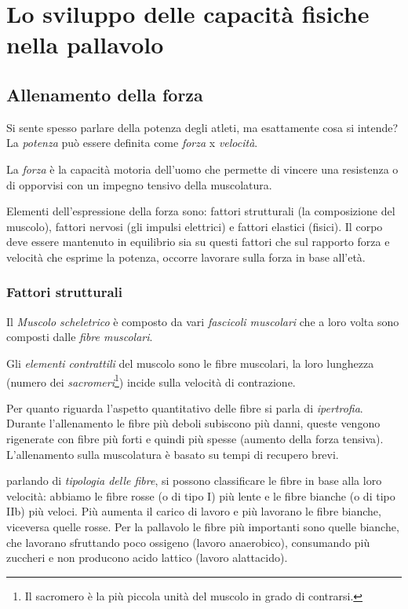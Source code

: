 \chapter{Lo sviluppo delle capacità fisiche nella pallavolo}\label{fisico}

\section{Allenamento della forza}
Si sente spesso parlare della potenza degli atleti, ma esattamente cosa si
intende? La \emph{potenza} può essere definita come \emph{forza} x
\emph{velocità}.

\begin{defi}
La \emph{forza} è la capacità motoria dell'uomo che permette di vincere una resistenza o di opporvisi con un impegno tensivo della muscolatura.
\end{defi}

Elementi dell'espressione della forza sono: fattori strutturali (la composizione
del muscolo), fattori nervosi (gli impulsi elettrici) e fattori elastici (fisici).
Il corpo deve essere mantenuto in equilibrio sia su questi fattori che sul
rapporto forza e velocità che esprime la potenza, occorre lavorare sulla forza
in base all'età.

\subsection{Fattori strutturali}
Il \emph{Muscolo scheletrico} è composto da vari \emph{fascicoli muscolari}
che a loro volta sono composti dalle \emph{fibre muscolari}.

Gli \emph{elementi contrattili} del muscolo sono le fibre muscolari, la loro
lunghezza (numero dei \emph{sacromeri}\footnote{Il sacromero è la più piccola
unità del muscolo in grado di contrarsi.}) incide sulla velocità di contrazione.

Per quanto riguarda l'aspetto quantitativo delle fibre si parla di
\emph{ipertrofia}. Durante l'allenamento le fibre più deboli subiscono più
danni, queste vengono rigenerate con fibre più forti e quindi più spesse
(aumento della forza tensiva). L'allenamento sulla muscolatura è basato su
tempi di recupero brevi.

parlando di \emph{tipologia delle fibre}, si possono classificare le fibre
in base alla
loro velocità: abbiamo le fibre rosse (o di tipo I) più lente e le fibre bianche
(o di tipo IIb) più veloci. Più aumenta il carico di lavoro e più lavorano le
fibre bianche, viceversa quelle rosse. Per la pallavolo le fibre più importanti
sono quelle bianche, che lavorano sfruttando poco ossigeno (lavoro anaerobico), consumando più zuccheri e non producono acido lattico (lavoro alattacido). 

